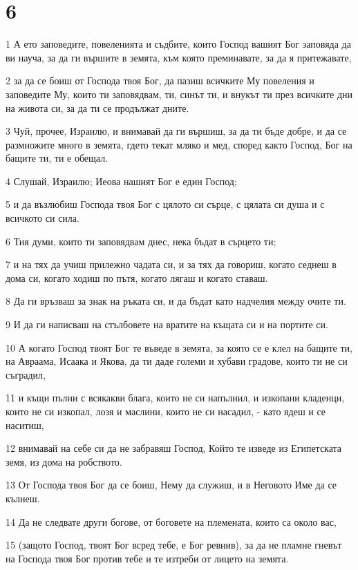 \chapter{6}

\par 1 А ето заповедите, повеленията и съдбите, които Господ вашият Бог заповяда да ви науча, за да ги вършите в земята, към която преминавате, за да я притежавате,
\par 2 за да се боиш от Господа твоя Бог, да пазиш всичките Му повеления и заповедите Му, които ти заповядвам, ти, синът ти, и внукът ти през всичките дни на живота си, за да ти се продължат дните.
\par 3 Чуй, прочее, Израилю, и внимавай да ги вършиш, за да ти бъде добре, и да се размножите много в земята, гдето текат мляко и мед, според както Господ, Бог на бащите ти, ти е обещал.
\par 4 Слушай, Израилю; Иеова нашият Бог е един Господ;
\par 5 и да възлюбиш Господа твоя Бог с цялото си сърце, с цялата си душа и с всичкото си сила.
\par 6 Тия думи, които ти заповядвам днес, нека бъдат в сърцето ти;
\par 7 и на тях да учиш прилежно чадата си, и за тях да говориш, когато седнеш в дома си, когато ходиш по пътя, когато лягаш и когато ставаш.
\par 8 Да ги връзваш за знак на ръката си, и да бъдат като надчелия между очите ти.
\par 9 И да ги написваш на стълбовете на вратите на къщата си и на портите си.
\par 10 А когато Господ твоят Бог те въведе в земята, за която се е клел на бащите ти, на Авраама, Исаака и Якова, да ти даде големи и хубави градове, които ти не си съградил,
\par 11 и къщи пълни с всякакви блага, които не си напълнил, и изкопани кладенци, които не си изкопал, лозя и маслини, които не си насадил, - като ядеш и се наситиш,
\par 12 внимавай на себе си да не забравяш Господ, Който те изведе из Египетската земя, из дома на робството.
\par 13 От Господа твоя Бог да се боиш, Нему да служиш, и в Неговото Име да се кълнеш.
\par 14 Да не следвате други богове, от боговете на племената, които са около вас,
\par 15 (защото Господ, твоят Бог всред тебе, е Бог ревнив), за да не пламне гневът на Господа твоя Бог против тебе и те изтреби от лицето на земята.
